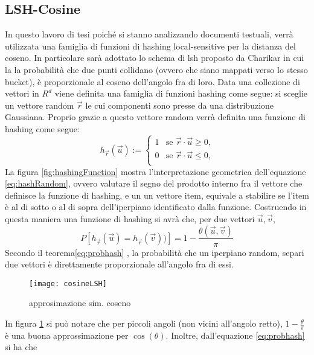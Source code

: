 \subsection{LSH-Cosine}
In questo lavoro di tesi poiché si stanno analizzando documenti testuali, verrà utilizzata una famiglia di funzioni di hashing local-sensitive per la distanza del coseno. In particolare sarà adottato lo schema di lsh proposto da Charikar\cite{Charikar:2002:SET:509907.509965} in cui la   la probabilità che due punti collidano (ovvero che siano mappati verso lo stesso bucket), è proporzionale al coseno dell'angolo fra di loro. Data una collezione di vettori in $R^d$ viene definita una famiglia di funzioni hashing come segue: si sceglie un vettore random $\vec{r}$ le cui componenti sono presse da una distribuzione Gaussiana. Proprio grazie a questo vettore random verrà definita una funzione di hashing come segue:
\begin{equation}
\label{eq:hashRandom}
h_{\vec{r}}(\vec{u}):=\begin{cases}
1& \text{se  $\vec{r}\cdot \vec{u}\geq0$,}\\
0& \text{se  $\vec{r}\cdot \vec{u}\leq0$,}\\
\end{cases}
\end{equation}
La figura \ref{fig:hashingFunction} mostra l'interpretazione geometrica dell'equazione \ref{eq:hashRandom}, ovvero valutare il segno del prodotto interno fra il vettore che definisce la funzione di hashing, e un un vettore item, equivale a stabilire se 
l'item è al di sotto o al di sopra dell'iperpiano identificato dalla funzione.
Costruendo in questa maniera una funzione di hashing si avrà che, per due vettori $\vec{u},\vec{v}$,
\begin{equation}
\label{eq:probhash}
P[h_{\vec{r}}(\vec{u})=h_{\vec{r}}(\vec{v}))]=1-\frac{\theta(\vec{u},\vec{v})}{\pi}
\end{equation} 
Secondo il teorema\ref{eq:probhash} \cite{Goemans:1995:IAA:227683.227684},  la probabilità che un iperpiano random, separi due vettori è direttamente proporzionale all'angolo fra di essi. 
\begin{figure}
    \centering
\texttt{[image: cosineLSH]}
\caption{approsimazione sim. coseno}
\label{fig:cosApprox}
\end{figure} 
In figura \ref{fig:cosApprox} si può notare che per piccoli angoli (non vicini all'angolo retto),  $ 1 - \frac{\theta}{\pi}$ è una buona approssimazione per  $\cos(\theta)$. Inoltre, dall'equazione \ref{eq:probhash} si ha che 
